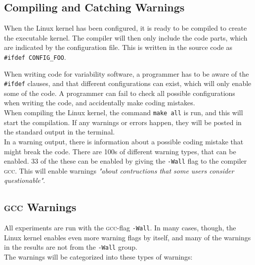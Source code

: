 \documentclass[a4paper,11pt]{report}
\newcommand{\textcode}[1]{\fboxsep=1pt\texttt{\colorbox{gray!20}{#1}}}
\begin{document}
            \subsection{Compiling and Catching Warnings}

When the Linux kernel has been configured, it is ready to be compiled to create 
the executable kernel. The compiler will then only include the code parts, 
which are indicated by the configuration file. This is written in the source 
code as \textcode{\#ifdef CONFIG\_FOO}.

When writing code for variability software, a programmer has to be aware of the 
\textcode{\#ifdef} clauses, and that different configurations can exist, which 
will only enable some of the code. A programmer can fail to check all possible 
configurations when writing the code, and accidentally make coding mistakes.
\\

When compiling the Linux kernel, the command \textcode{make all} is run, and 
this will start the compilation. If any warnings or errors happen, they will be 
posted in the standard output in the terminal.
\\

In a warning output, there is information about a possible coding mistake that 
might break the code. There are 100s of different warning types, that can be 
enabled. 33 of the these can be enabled by giving the \textcode{-Wall} flag 
to the compiler \textsc{gcc}\cite{gccwarnings}. This will enable warnings 
\emph{"about contructions that some users consider 
questionable"}\cite{gccwarnings}.



            \subsection{\textsc{gcc} Warnings}
            \label{sec:gccwarns}
All experiments are run with the \textsc{gcc}-flag \textcode{-Wall}. In many 
cases, though, the Linux kernel enables even more warning flags by itself, and
many of the warnings in the results are not from the \texttt{-Wall} group.
\\

The warnings will be categorized into these types of warnings:
\end{document}
